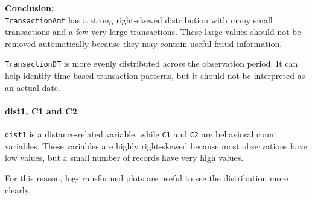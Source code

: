 \documentclass[11pt]{article}
\begin{document}
    \textbf{Conclusion:}\\
\texttt{TransactionAmt} has a strong right-skewed distribution with many
small transactions and a few very large transactions. These large values
should not be removed automatically because they may contain useful
fraud information.

\texttt{TransactionDT} is more evenly distributed across the observation
period. It can help identify time-based transaction patterns, but it
should not be interpreted as an actual date.

    \paragraph{dist1, C1 and C2}\label{dist1-c1-and-c2}

    \texttt{dist1} is a distance-related variable, while \texttt{C1} and
\texttt{C2} are behavioral count variables. These variables are highly
right-skewed because most observations have low values, but a small
number of records have very high values.

For this reason, log-transformed plots are useful to see the
distribution more clearly.
\end{document}
